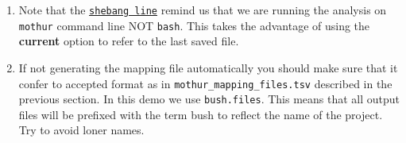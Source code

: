 \documentclass[
  12pt,
  openany]{book}
\providecommand{\tightlist}{%
  \setlength{\itemsep}{0pt}\setlength{\parskip}{0pt}}
\begin{document}
\begin{enumerate}
\def\labelenumi{\arabic{enumi}.}
\tightlist
\item
  Note that the
  \href{https://en.wikipedia.org/wiki/Shebang_(Unix)}{\texttt{shebang\ line}}
  remind us that we are running the analysis on \texttt{mothur} command
  line NOT \texttt{bash}. This takes the advantage of using the
  \textbf{current} option to refer to the last saved file.
\item
  If not generating the mapping file automatically you should make sure
  that it confer to accepted format as in
  \texttt{mothur\_mapping\_files.tsv} described in the previous section.
  In this demo we use \texttt{bush.files}. This means that all output
  files will be prefixed with the term bush to reflect the name of the
  project. Try to avoid loner names.
\end{enumerate}
\end{document}
